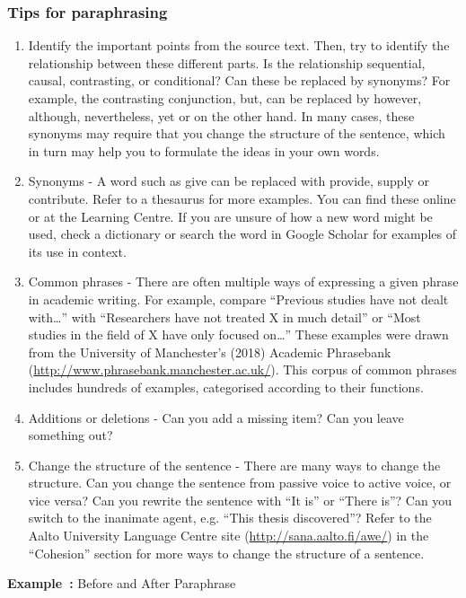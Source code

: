 \documentclass[english, 12pt, a4paper, elec, utf8, a-2b, online]{aaltothesis}
\begin{document}
\subsubsection*{Tips for paraphrasing}

\begin{enumerate}
	\item Identify the important points from the source text. Then, try to 
	identify the relationship between these different parts. Is the relationship
	sequential, causal, contrasting, or conditional? Can these be replaced by 
	synonyms? For example, the contrasting conjunction, but, can be replaced by 
	however, although, nevertheless, yet or on the other hand. In many cases, 
	these synonyms may require that you change the structure of the sentence, 
	which in turn may help you to formulate the ideas in your own words.
	\item Synonyms - A word such as give can be replaced with provide, supply or
	contribute. Refer to a thesaurus for more examples. You can find these 
	online or at the Learning Centre. If you are unsure of how a new word might 
	be used, check a dictionary or search the word in Google Scholar for 
	examples of its use in context.
	\item Common phrases - There are often multiple ways of expressing a given 
	phrase in academic writing. For example, compare “Previous studies have not 
	dealt with\ldots” with “Researchers have not treated X in much detail” or 
	“Most studies in the field of X have only focused on\ldots” These examples 
	were drawn from the University of Manchester’s (2018) Academic Phrasebank  (\url{http://www.phrasebank.manchester.ac.uk/}). This corpus of common 
	phrases includes hundreds of examples, categorised according to their 
	functions.
	\item Additions or deletions - Can you add a missing item? Can you leave 
	something out?
	\item Change the structure of the sentence - There are many ways to change 
	the structure. Can you change the sentence from passive voice to active 
	voice, or vice versa? Can you rewrite the sentence with “It is” or “There 
	is”? Can you switch to the inanimate agent, e.g. “This thesis discovered”? 
	Refer to the Aalto University Language Centre site 
	(\url{http://sana.aalto.fi/awe/}) in the “Cohesion” section for more ways to
	change the structure of a sentence.
\end{enumerate}

\vspace{1em}
\noindent
{}
\textsf{\textbf{Example~\theexample:}} Before and After Paraphrase
\end{document}
